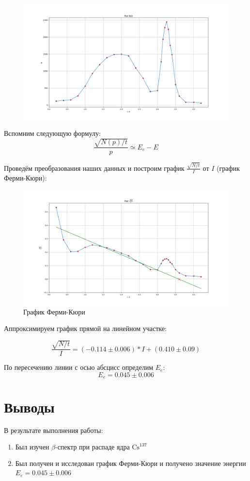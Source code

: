 \documentclass{article}
\begin{document}
\begin{figure}[H]
	\includegraphics[width=\textwidth]{I-N.png}
\end{figure}

Вспомним следующую формулу:
\[ \frac{\sqrt{N(p)/t}}{p} \simeq E_e - E \]

Проведём преобразования наших данных и построим график \(\frac{\sqrt{N/t}}{I}\) от \(I\)
(график Ферми-Кюри):

\begin{figure}[H]
	\includegraphics[width=\textwidth]{I-Nr.png}
	\caption{График Ферми-Кюри}
\end{figure}

Аппроксимируем график прямой на линейном участке:

\[ \frac{\sqrt{N/t}}{I} = (-0.114 \pm 0.006) * I + (0.410 \pm 0.09)\]

По пересечению линии с осью абсцисс определим \(E_e\):
\[ E_e = 0.045 \pm 0.006 \]

\section{Выводы}
В результате выполнения работы:
\begin{enumerate}
	\item Был изучен \(\beta\)-спектр при распаде ядра \(\text{Cs}^{137}\)
	\item Был получен и исследован график Ферми-Кюри и получено значение энергии \(E_e = 0.045 \pm 0.006\)
\end{enumerate}
\end{document}
